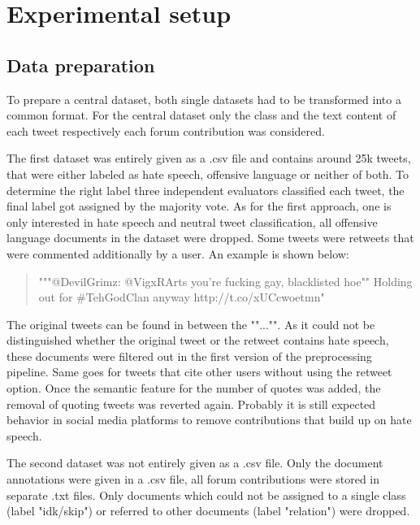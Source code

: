 \section{Experimental setup} \label{experimental_setup}

\subsection{Data preparation}

To prepare a central dataset, both single datasets had to be transformed into a common format. For the central dataset only the class and the text content of each tweet respectively each forum contribution was considered.

The first dataset  was entirely given as a .csv file and contains around 25k tweets, that were either labeled as hate speech, offensive language or neither of both. To determine the right label three independent evaluators classified each tweet, the final label got assigned by the majority vote. As for the first approach, one is only interested in hate speech and neutral tweet classification, all offensive language documents in the dataset were dropped. Some tweets were retweets that were commented additionally by a user. An example is shown below:

\begin{quote}
    """@DevilGrimz: @VigxRArts you're fucking gay, blacklisted hoe"" Holding out for \#TehGodClan anyway http://t.co/xUCcwoetmn"
\end{quote}

The original tweets can be found in between the ""..."". As it could not be distinguished whether the original tweet or the retweet contains hate speech, these documents were filtered out in the first version of the preprocessing pipeline. Same goes for tweets that cite other users without using the retweet option. Once the semantic feature for the number of quotes was added, the removal of quoting tweets was reverted again. Probably it is still expected behavior in social media platforms to remove contributions that build up on hate speech. 

The second dataset  was not entirely given as a .csv file. Only the document annotations were given in a .csv file, all forum contributions were stored in separate .txt files. Only documents which could not be assigned to a single class (label "idk/skip") or referred to other documents (label "relation") were dropped.

